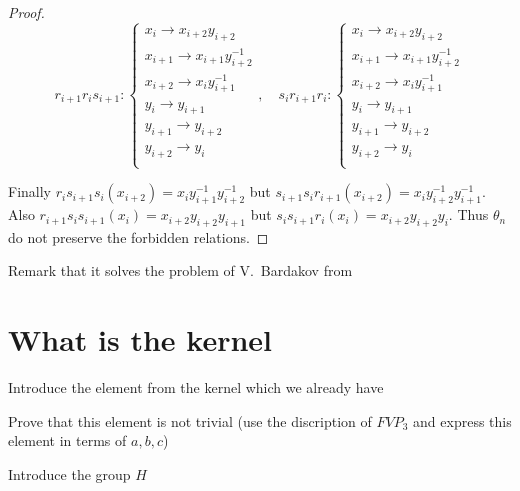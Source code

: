 \documentclass{article}
\begin{document}
\begin{proof}
$$
r_{i+1}r_is_{i+1}:
\begin{cases}
x_i\rightarrow x_{i+2}y_{i+2}\\
x_{i+1}\rightarrow x_{i+1}y_{i+2}^{-1}\\
x_{i+2}\rightarrow x_iy_{i+1}^{-1}\\
y_{i} \rightarrow y_{i+1}\\
y_{i+1} \rightarrow y_{i+2}\\
y_{i+2} \rightarrow y_{i}\\
\end{cases}, \quad
s_ir_{i+1}r_i:
\begin{cases}
x_i\rightarrow x_{i+2}y_{i+2}\\
x_{i+1}\rightarrow x_{i+1}y_{i+2}^{-1}\\
x_{i+2}\rightarrow x_iy_{i+1}^{-1}\\
y_{i} \rightarrow y_{i+1}\\
y_{i+1} \rightarrow y_{i+2}\\
y_{i+2} \rightarrow y_{i}\\
\end{cases} 
$$

Finally $r_is_{i+1}s_i(x_{i+2})=x_iy_{i+1}^{-1}y_{i+2}^{-1}$ but $s_{i+1}s_ir_{i+1}(x_{i+2})=x_iy_{i+2}^{-1}y_{i+1}^{-1}$. Also $r_{i+1}s_is_{i+1}(x_i)=x_{i+2}y_{i+2}y_{i+1}$ but $s_is_{i+1}r_i(x_i)=x_{i+2}y_{i+2}y_i$. Thus $\theta_n$ do not preserve the forbidden relations.    
\end{proof}

Remark that it solves the problem of V.~Bardakov from \cite{problems}
\section{What is the kernel}
Introduce the element from the kernel which we already have

Prove that this element is not trivial (use the discription of $FVP_3$ and express this element in terms of $a,b,c$)

Introduce the group $H$
\end{document}
